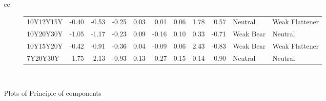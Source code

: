 \documentclass[a4paper,twoside]{report}
\begin{document}
\begin{figure}[htbp]
\begin{tabular}[c]{cc}
\begin{subfigure}[c]{0.5\textwidth}
\begin{adjustbox}{max width=\textwidth}
\begin{tabular}{lrrrrrrrrll}
 10Y12Y15Y &  -0.40 &    -0.53 &     -0.25 &   0.03 &  0.01 &      0.06 &   1.78 &     0.57 &      Neutral &  Weak Flattener \\
 10Y20Y30Y &  -1.05 &    -1.17 &     -0.23 &   0.09 & -0.16 &      0.10 &   0.33 &    -0.71 &    Weak Bear &         Neutral \\
 10Y15Y20Y &  -0.42 &    -0.91 &     -0.36 &   0.04 & -0.09 &      0.06 &   2.43 &    -0.83 &    Weak Bear &  Weak Flattener \\
  7Y20Y30Y &  -1.75 &    -2.13 &     -0.93 &   0.13 & -0.27 &      0.15 &   0.14 &    -0.90 &      Neutral &         Neutral \\
\hline
\end{tabular}
\end{adjustbox}
 \end{subfigure}\\
 
 
 
\end{tabular}
 \caption{Plots of Principle of components}\label{fig:bubble plots}
 \end{figure}
 
 
 
\end{document}
